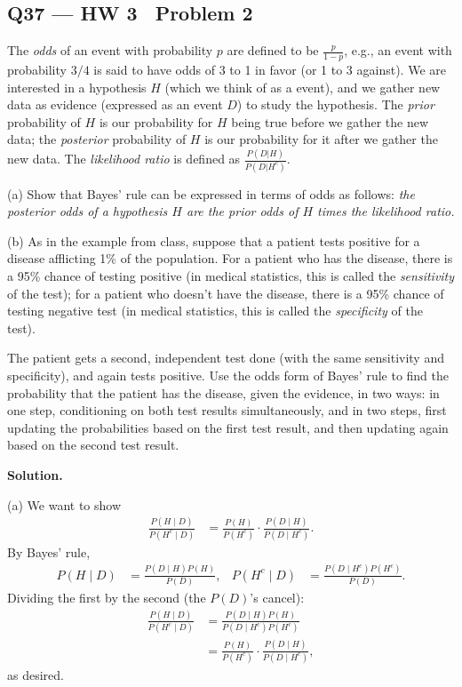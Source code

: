 \documentclass[11pt]{article}
\begin{document}
\subsection*{Q37 --- HW 3 \textperiodcentered\ Problem 2}
\begin{qbox}
The \textit{odds} of an event with probability $p$ are defined to be $\frac{p}{1-p}$, e.g., an event with probability $3/4$ is said to have odds of 3 to 1 in favor (or 1 to 3 against). We are interested in a hypothesis $H$ (which we think of as a event), and we gather new data as evidence (expressed as an event $D$) to study the hypothesis. The \textit{prior} probability of $H$ is our probability for $H$ being true before we gather the new data; the \textit{posterior} probability of $H$ is our probability for it after we gather the new data. The \textit{likelihood ratio} is defined as $\frac{P(D|H)}{P(D|H^c)}$.

(a) Show that Bayes' rule can be expressed in terms of odds as follows: \textit{the posterior odds of a hypothesis $H$ are the prior odds of $H$ times the likelihood ratio.}

(b) As in the example from class, suppose that a patient tests positive for a disease afflicting 1\% of the population. For a patient who has the disease, there is a 95\% chance of testing positive (in medical statistics, this is called the \textit{sensitivity} of the test); for a patient who doesn't have the disease, there is a 95\% chance of testing negative test (in medical statistics, this is called the \textit{specificity} of the test).

The patient gets a second, independent test done (with the same sensitivity and specificity), and again tests positive. Use the odds form of Bayes' rule to find the probability that the patient has the disease, given the evidence, in two ways: in one step, conditioning on both test results simultaneously, and in two steps, first updating the probabilities based on the first test result, and then updating again based on the second test result.
\end{qbox}
\textbf{Solution.}

(a) We want to show
\begin{align*}
\frac{P(H\mid D)}{P(H^c\mid D)} &= \frac{P(H)}{P(H^c)}\cdot\frac{P(D\mid H)}{P(D\mid H^c)}.
\end{align*}
By Bayes' rule,
\begin{align*}
P(H\mid D) &= \frac{P(D\mid H)P(H)}{P(D)}, & P(H^c\mid D) &= \frac{P(D\mid H^c)P(H^c)}{P(D)}.
\end{align*}
Dividing the first by the second (the $P(D)$'s cancel):
\begin{align*}
\frac{P(H\mid D)}{P(H^c\mid D)} &= \frac{P(D\mid H)P(H)}{P(D\mid H^c)P(H^c)} \\
&= \frac{P(H)}{P(H^c)}\cdot\frac{P(D\mid H)}{P(D\mid H^c)},
\end{align*}
as desired.
\end{document}
